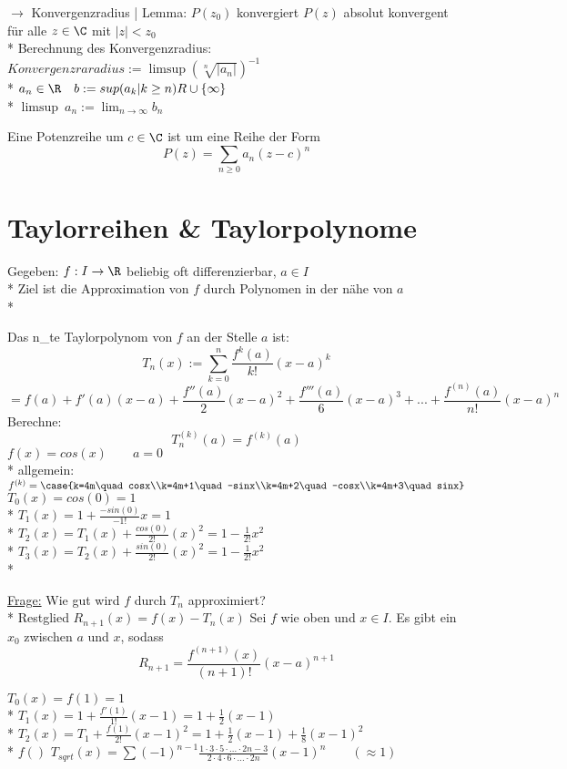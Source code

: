 
$\to$ Konvergenzradius | Lemma: $P(z_0)$ konvergiert \Rarr{} $P(z)$ absolut konvergent für alle $z \in \C$ mit $|z| < z_0$\\*
Berechnung des Konvergenzradius: \\
$Konvergenzraradius:= \limsup (\sqrt[n]{|a_n|} )^{-1}$\\*
$a_n\in\R \quad b:= sup(a_k| k \geq n) \\R \cup \{\infty\}$\\*
$\limsup\ a_n := \lim_{n\to \infty} b_n$


Eine Potenzreihe um $c\in \C$ ist um eine Reihe der Form $$P(z) = \sum_{n \geq 0} a_n (z-c)^n$$

\chapter{Taylorreihen & Taylorpolynome}
Gegeben: $f: I \to \R$ beliebig oft differenzierbar, $a \in I$\\*
Ziel ist die Approximation von $f$ durch Polynomen in der nähe von $a$\\*

Das n_te Taylorpolynom von $f$ an der Stelle $a$ ist: 
$$T_n(x) := \sum_{k=0}^{n} \frac{f^k(a)}{k!} (x-a)^k$$
$$=f(a) + f'(a)(x-a) + \frac{f''(a)}{2}(x-a)^2 + \frac{f'''(a)}{6} (x-a)^3 + ... + \frac{f^{(n)}(a)}{n!} (x-a)^n$$
Berechne: $$T_n^{(k)}(a) = f^{(k)} (a)$$
\bsp
$f(x) = cos(x)\qquad a=0$\\*
allgemein: $f^{(k)}=\case{k=4m\quad cosx\\k=4m+1\quad -sinx\\k=4m+2\quad -cosx\\k=4m+3\quad sinx}$
$T_0(x) = cos (0) = 1$\\*
$T_1(x) = 1 + \frac{-sin(0)}{-1!} x = 1$\\*
$T_2(x) = T_1(x) + \frac{cos(0)}{2!}(x)^2 = 1 - \frac{1}{2!}x^2$\\*
$T_3(x) = T_2(x) + \frac{sin(0)}{2!}(x)^2 = 1 - \frac{1}{2!}x^2$\\*

\ul{Frage:} Wie gut wird $f$ durch $T_n$ approximiert?\\*
Restglied $R_{n+1}(x) = f(x) - T_n(x)$
\setcounter{section}{4}
Sei $f$ wie oben und $x \in I$. Es gibt ein $x_0$ zwischen $a$ und $x$, sodass $$R_{n+1} = \frac{f^{(n+1)}(x)}{(n+1)!}(x-a)^{n+1}$$

$T_0(x) = f(1) = 1$\\*
$T_1(x) = 1 + \frac{f'(1)}{1!} (x-1) = 1 + \frac{1}{2}(x-1)$\\*
$T_2(x) = T_1 + \frac{f(1)}{2!} (x-1)^2 = 1+\frac{1}{2}(x-1) + \frac{1}{8}(x-1)^2$\\*
$f()$
$T_{sqrt{}}(x) = \sum (-1)^{n-1} \frac{1 \cdot 3 \cdot 5 \cdot ... \cdot 2n -3}{2 \cdot 4 \cdot 6 \cdot ... \cdot 2n} (x-1)^n \qquad (\approx 1)$